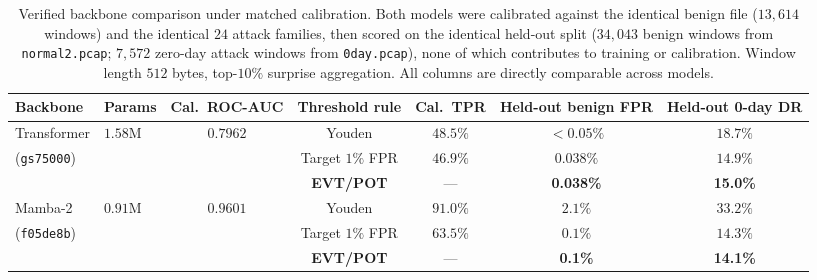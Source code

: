 \documentclass[10pt,journal,compsoc]{IEEEtran}
\begin{document}
\begin{table}[t]
\caption{Verified backbone comparison under matched calibration. Both models were calibrated against the identical benign file ($13{,}614$ windows) and the identical $24$ attack families, then scored on the identical held-out split ($34{,}043$ benign windows from \texttt{normal2.pcap}; $7{,}572$ zero-day attack windows from \texttt{0day.pcap}), none of which contributes to training or calibration. Window length $512$ bytes, top-$10\%$ surprise aggregation. All columns are directly comparable across models.}
\label{tab:results}
\centering
\begin{tabular*}{\textwidth}{@{\extracolsep{\fill}}llccccc}
\toprule
\textbf{Backbone} & \textbf{Params} & \textbf{Cal.\ ROC-AUC} & \textbf{Threshold rule} & \textbf{Cal.\ TPR} & \textbf{Held-out benign FPR} & \textbf{Held-out 0-day DR} \\
\midrule
Transformer            & $1.58$M & $0.7962$ & Youden           & $48.5\%$ & $<0.05\%$ & $18.7\%$ \\
(\texttt{gs75000})     &         &          & Target $1\%$ FPR & $46.9\%$ & $0.038\%$ & $14.9\%$ \\
                       &         &          & \textbf{EVT/POT} & ---      & \textbf{0.038\%} & \textbf{15.0\%} \\
\midrule
Mamba-2                & $0.91$M & $0.9601$ & Youden           & $91.0\%$ & $2.1\%$   & $33.2\%$ \\
(\texttt{f05de8b})     &         &          & Target $1\%$ FPR & $63.5\%$ & $0.1\%$   & $14.3\%$ \\
                       &         &          & \textbf{EVT/POT} & ---      & \textbf{0.1\%}   & \textbf{14.1\%} \\
\bottomrule
\end{tabular*}
\end{table}
\end{document}
